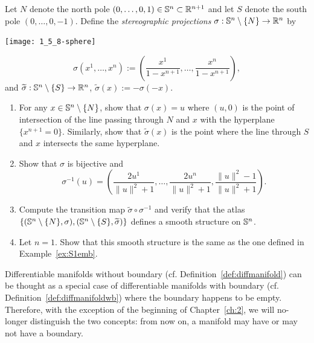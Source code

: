 \begin{exercise}
  Let $N$ denote the north pole $(0,\ldots,0,1)\in\mathbb{S}^n\subset\mathbb{R}^{n+1}$ and let $S$ denote the south pole $(0,\ldots,0,-1)$.
  Define the \emph{stereographic projections} $\sigma:\mathbb{S}^n\setminus\{N\}\to \mathbb{R}^n$ by
  \begin{marginfigure}
    \texttt{[image: 1\_5\_8-sphere]}
  \end{marginfigure}
  \begin{equation}
    \sigma(x^1,\ldots,x^n) := \left(\frac{x^1}{1-x^{n+1}},\ldots,\frac{x^n}{1-x^{n+1}}\right),
  \end{equation}
  and $\widetilde\sigma:\mathbb{S}^n\setminus\{S\}\to \mathbb{R}^n$, $\widetilde\sigma(x) := -\sigma(-x)$.
  \begin{enumerate}
    \item For any $x\in\mathbb{S}^n\setminus\{N\}$, show that $\sigma(x)=u$ where $(u,0)$ is the point of intersection of the line passing through $N$ and $x$ with the hyperplane $\{x^{n+1}=0\}$.
    Similarly, show that $\widetilde\sigma(x)$ is the point where the line through $S$ and $x$ intersects the same hyperplane.
    \item Show that $\sigma$ is bijective and
    \begin{equation}
      \sigma^{-1}(u) = \left(\frac{2 u^1}{\|u\|^2+1}, \ldots,\frac{2 u^n}{\|u\|^2+1},\frac{\|u\|^2-1}{\|u\|^2+1}\right).
    \end{equation}
    \item Compute the transition map $\widetilde\sigma\circ\sigma^{-1}$ and verify that the atlas $\{(\mathbb{S}^n\setminus\{N\},\sigma),(\mathbb{S}^n\setminus\{S\},\widetilde\sigma)\}$ defines a smooth structure on $\mathbb{S}^n$.
    \item Let $n=1$. Show that this smooth structure is the same as the one defined in Example~\ref{ex:S1emb}.
  \end{enumerate}
\end{exercise}

\begin{tcolorbox}
  Differentiable manifolds without boundary (cf. Definition~\ref{def:diffmanifold}) can be thought as a special case of differentiable manifolds with boundary (cf. Definition~\ref{def:diffmanifoldwb}) where the boundary happens to be empty.
  Therefore, with the exception of the beginning of Chapter~\ref{ch:2}, we will no-longer distinguish the two concepts: from now on, a manifold may have or may not have a boundary.
\end{tcolorbox}